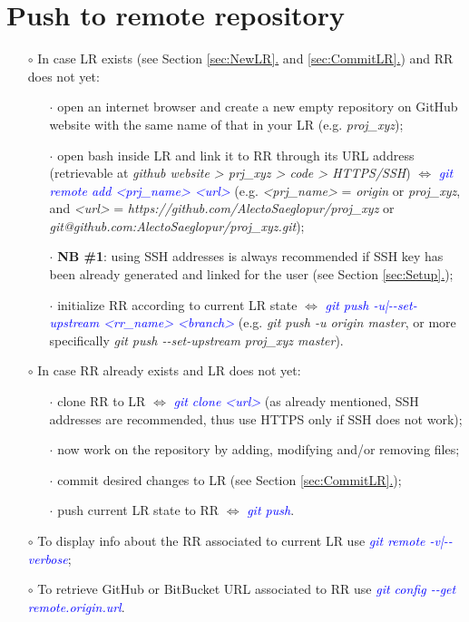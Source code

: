 \documentclass[a4paper,portrait,10pt]{article}   %
\newcommand{\mybulletlvA}{$\circ$}   %
\newcommand{\mybulletlvB}{$\cdot$}   %
\newcommand{\mydiv}{$\Leftrightarrow$ }   %
\newcommand{\mycmd}[1]{\textcolor{blue}{\textit{#1}}}   %
\newcommand{\myparvspace}{\vspace{4mm}}   %
\newcommand{\mysecvspace}{\vspace{6mm}}   %
\newcommand{\mysecref}[1]{\hyperref[#1]{\ref{#1}.}}   %
\begin{document}

\section{Push to remote repository}   \label{sec:PushRR}

\begin{itemize}
\item[\mybulletlvA] In case LR exists (see Section \mysecref{sec:NewLR} and \mysecref{sec:CommitLR}) and RR does not yet:
\begin{itemize}
  \item[\mybulletlvB] open an internet browser and create a new empty repository on GitHub website with the same name of that in your LR (e.g. \textit{proj\_xyz});
  \item[\mybulletlvB] open bash inside LR and link it to RR through its URL address (retrievable at \textit{github website > prj\_xyz > code > HTTPS/SSH}) \mydiv \mycmd{git remote add <prj\_name> <url>} (e.g. \textit{<prj\_name>} = \textit{origin} or \textit{proj\_xyz}, and \textit{<url>} = \textit{https://github.com/AlectoSaeglopur/proj\_xyz} or \textit{git@github.com:AlectoSaeglopur/proj\_xyz.git});
  \item[\mybulletlvB] \textbf{NB \#1}: using SSH addresses is always recommended if SSH key has been already generated and linked for the user (see Section \mysecref{sec:Setup});
  \item[\mybulletlvB] initialize RR according to current LR state \mydiv \mycmd{git push -u|-{}-set-upstream <rr\_name> <branch>} (e.g. \textit{git push -u origin master}, or more specifically \textit{git push -{}-set-upstream proj\_xyz master}).
\end{itemize}
\myparvspace

\item[\mybulletlvA] In case RR already exists and LR does not yet:
\begin{itemize}
  \item[\mybulletlvB] clone RR to LR \mydiv \mycmd{git clone <url>} (as already mentioned, SSH addresses are recommended, thus use HTTPS only if SSH does not work);
  \item[\mybulletlvB] now work on the repository by adding, modifying and/or removing files;
  \item[\mybulletlvB] commit desired changes to LR (see Section \mysecref{sec:CommitLR});
  \item[\mybulletlvB] push current LR state to RR \mydiv \mycmd{git push}.
\end{itemize}
\myparvspace

\item[\mybulletlvA] To display info about the RR associated to current LR use \mycmd{git remote -v|-{}-verbose};
\myparvspace

\item[\mybulletlvA] To retrieve GitHub or BitBucket URL associated to RR use \mycmd{git config -{}-get remote.origin.url}.
\end{itemize}
\mysecvspace
\end{document}
